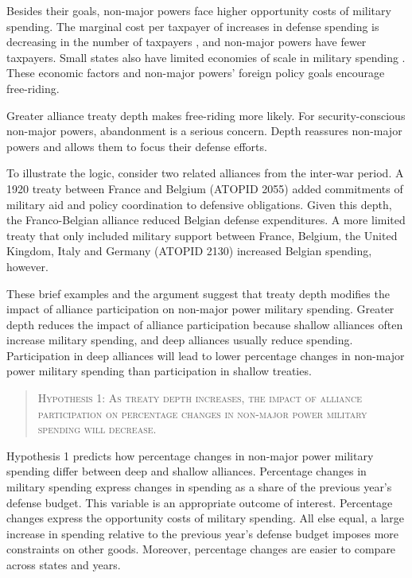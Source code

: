 \documentclass[12pt]{article}
\begin{document}
Besides their goals, non-major powers face higher opportunity costs of military spending. 
The marginal cost per taxpayer of increases in defense spending is decreasing in the number of taxpayers \citep{DudleyMontmarquette1981}, and non-major powers have fewer taxpayers. 
Small states also have limited economies of scale in military spending \citep{Moravcsik1991, Kapstein1991, Anderton1995, Devore2013}.
These economic factors and non-major powers' foreign policy goals encourage free-riding.  


Greater alliance treaty depth makes free-riding more likely. 
For security-conscious non-major powers, abandonment is a serious concern. 
Depth reassures non-major powers and allows them to focus their defense efforts. 


To illustrate the logic, consider two related alliances from the inter-war period. 
A 1920 treaty between France and Belgium (ATOPID 2055) added commitments of military aid and policy coordination to defensive obligations. 
Given this depth, the Franco-Belgian alliance reduced Belgian defense expenditures. 
A more limited treaty that only included military support between France, Belgium, the United Kingdom, Italy and Germany (ATOPID 2130) increased Belgian spending, however.  
 
 
These brief examples and the argument suggest that treaty depth modifies the impact of alliance participation on non-major power military spending. 
Greater depth reduces the impact of alliance participation because shallow alliances often increase military spending, and deep alliances usually reduce spending.  
Participation in deep alliances will lead to lower percentage changes in non-major power military spending than participation in shallow treaties. 
 

\begin{quote}
\textsc{Hypothesis 1: As treaty depth increases, the impact of alliance participation on percentage changes in non-major power military spending will decrease.}
\end{quote}


Hypothesis 1 predicts how percentage changes in non-major power military spending differ between deep and shallow alliances. 
Percentage changes in military spending express changes in spending as a share of the previous year's defense budget.
This variable is an appropriate outcome of interest. 
Percentage changes express the opportunity costs of military spending. 
All else equal, a large increase in spending relative to the previous year's defense budget imposes more constraints on other goods. 
Moreover, percentage changes are easier to compare across states and years. 
\end{document}
